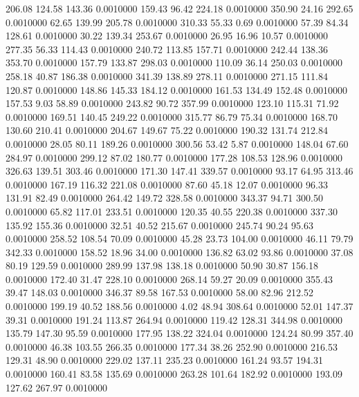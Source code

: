  206.08  124.58  143.36   0.0010000
 159.43   96.42  224.18   0.0010000
 350.90   24.16  292.65   0.0010000
  62.65  139.99  205.78   0.0010000
 310.33   55.33    0.69   0.0010000
  57.39   84.34  128.61   0.0010000
  30.22  139.34  253.67   0.0010000
  26.95   16.96   10.57   0.0010000
 277.35   56.33  114.43   0.0010000
 240.72  113.85  157.71   0.0010000
 242.44  138.36  353.70   0.0010000
 157.79  133.87  298.03   0.0010000
 110.09   36.14  250.03   0.0010000
 258.18   40.87  186.38   0.0010000
 341.39  138.89  278.11   0.0010000
 271.15  111.84  120.87   0.0010000
 148.86  145.33  184.12   0.0010000
 161.53  134.49  152.48   0.0010000
 157.53    9.03   58.89   0.0010000
 243.82   90.72  357.99   0.0010000
 123.10  115.31   71.92   0.0010000
 169.51  140.45  249.22   0.0010000
 315.77   86.79   75.34   0.0010000
 168.70  130.60  210.41   0.0010000
 204.67  149.67   75.22   0.0010000
 190.32  131.74  212.84   0.0010000
  28.05   80.11  189.26   0.0010000
 300.56   53.42    5.87   0.0010000
 148.04   67.60  284.97   0.0010000
 299.12   87.02  180.77   0.0010000
 177.28  108.53  128.96   0.0010000
 326.63  139.51  303.46   0.0010000
 171.30  147.41  339.57   0.0010000
  93.17   64.95  313.46   0.0010000
 167.19  116.32  221.08   0.0010000
  87.60   45.18   12.07   0.0010000
  96.33  131.91   82.49   0.0010000
 264.42  149.72  328.58   0.0010000
 343.37   94.71  300.50   0.0010000
  65.82  117.01  233.51   0.0010000
 120.35   40.55  220.38   0.0010000
 337.30  135.92  155.36   0.0010000
  32.51   40.52  215.67   0.0010000
 245.74   90.24   95.63   0.0010000
 258.52  108.54   70.09   0.0010000
  45.28   23.73  104.00   0.0010000
  46.11   79.79  342.33   0.0010000
 158.52   18.96   34.00   0.0010000
 136.82   63.02   93.86   0.0010000
  37.08   80.19  129.59   0.0010000
 289.99  137.98  138.18   0.0010000
  50.90   30.87  156.18   0.0010000
 172.40   31.47  228.10   0.0010000
 268.14   59.27   20.09   0.0010000
 355.43   39.47  148.03   0.0010000
 346.37   89.58  167.53   0.0010000
  58.00   82.96  212.52   0.0010000
 199.19   40.52  188.56   0.0010000
   4.02   48.94  308.64   0.0010000
  52.01  147.37   39.31   0.0010000
 191.24  113.87  264.94   0.0010000
 119.42  128.31  344.98   0.0010000
 135.79  147.30   95.59   0.0010000
 177.95  138.22  324.04   0.0010000
 124.24   80.99  357.40   0.0010000
  46.38  103.55  266.35   0.0010000
 177.34   38.26  252.90   0.0010000
 216.53  129.31   48.90   0.0010000
 229.02  137.11  235.23   0.0010000
 161.24   93.57  194.31   0.0010000
 160.41   83.58  135.69   0.0010000
 263.28  101.64  182.92   0.0010000
 193.09  127.62  267.97   0.0010000
